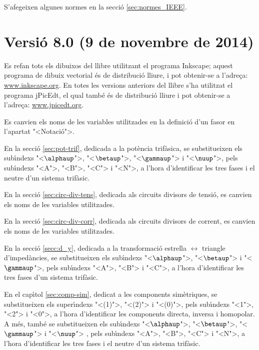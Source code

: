 S'afegeixen algunes normes en la secci\'{o} \ref{sec:normes_IEEE}.


\section*{Versi\'{o} 8.0 (9 de novembre de 2014)}

Es refan tots els dibuixos del llibre utilitzant el programa Inkscape; aquest programa de dibuix vectorial \'{e}s de distribuci\'{o} lliure, i pot obtenir-se a l'adre\c{c}a: \href{http://www.inkscape.org/}{www.inkscape.org}. En totes les versions anteriors del llibre s'ha utilitzat el programa jPicEdt, el qual tamb\'{e} \'{e}s de distribuci\'{o} lliure i pot obtenir-se a l'adre\c{c}a: \href{http://www.jpicedt.org/}{www.jpicedt.org}.

Es canvien els noms de les variables utilitzades en la definici\'{o} d'un fasor en l'apartat {"<}Notaci\'{o}{">}.

En la secci\'{o} \ref{sec:pot-trif}, dedicada a la pot\`{e}ncia trif\`{a}sica, se substitueixen els sub\'{\i}ndexs {"<}$\alphaup${">}, {"<}$\betaup${">}, {"<}$\gammaup${">} i {"<}$\nuup${">}, pels sub\'{\i}ndexs {"<}A{">}, {"<}B{">}, {"<}C{">} i {"<}N{">}, a l'hora d'identificar les tres fases  i el neutre d'un sistema trif\`{a}sic.

En la secci\'{o} \ref{sec:circ-div-tens},  dedicada als circuits divisors de tensi\'{o}, es canvien els noms de les variables utilitzades.

En la secci\'{o} \ref{sec:circ-div-corr},  dedicada als circuits divisors de corrent, es canvien els noms de les variables utilitzades.

En la secci\'{o} \ref{secc:d_y}, dedicada a la transformaci\'{o} estrella $\boldsymbol{\leftrightarrow}$ triangle d'imped\`{a}ncies, se substitueixen els sub\'{\i}ndexs {"<}$\alphaup${">}, {"<}$\betaup${">} i {"<}$\gammaup${">}, pels sub\'{\i}ndexs {"<}A{">}, {"<}B{">} i {"<}C{">}, a l'hora d'identificar les tres fases d'un sistema trif\`{a}sic.

En el cap\'{\i}tol \ref{sec:comp-sim}, dedicat a les components sim\`{e}triques, se substitueixen els super\'{\i}ndexs {"<}(1){">}, {"<}(2){">} i {"<}(0){">}, pels sub\'{\i}ndexs {"<}1{">}, {"<}2{">} i {"<}0{">}, a l'hora d'identificar les components directa, inversa i homopolar. A m\'{e}s, tamb\'{e} se substitueixen els sub\'{\i}ndexs {"<}$\alphaup${">}, {"<}$\betaup${">}, {"<}$\gammaup${">} i {"<}$\nuup${">} , pels sub\'{\i}ndexs {"<}A{">}, {"<}B{">},  {"<}C{">} i {"<}N{">}, a l'hora d'identificar les tres fases i el neutre d'un sistema trif\`{a}sic.

